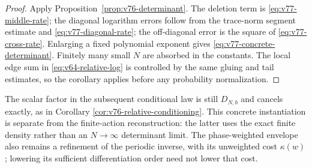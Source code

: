 \begin{proof}
Apply Proposition~\ref{prop:v76-determinant}.  The deletion term is
\eqref{eq:v77-middle-rate}; the diagonal logarithm errors follow from
the trace-norm segment estimate and \eqref{eq:v77-diagonal-rate};
the off-diagonal error is the square of
\eqref{eq:v77-cross-rate}.  Enlarging a fixed polynomial exponent gives
\eqref{eq:v77-concrete-determinant}.  Finitely many small $N$ are
absorbed in the constants.  The local edge sum in
\eqref{eq:v64-relative-log} is controlled by the same gluing and tail
estimates, so the corollary applies before any probability normalization.
\end{proof}

The scalar factor in the subsequent conditional law is still
$D_{N,b}$ and cancels exactly, as in Corollary
\ref{cor:v76-relative-conditioning}.  This concrete instantiation is
separate from the finite-action reconstruction: the latter uses the
exact finite density rather than an $N\to\infty$ determinant limit.
The phase-weighted envelope also remains a refinement of the periodic
inverse, with its unweighted cost $\kappa(w)$; lowering its sufficient
differentiation order need not lower that cost.
